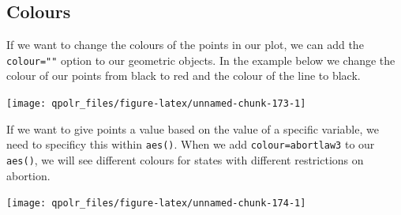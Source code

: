 \documentclass[12pt,oneside]{reedthesis}
\theoremstyle{definition}
\theoremstyle{definition}
\theoremstyle{definition}
\theoremstyle{remark}
\begin{document}
  \subsection{Colours}\label{colours}
  
  If we want to change the colours of the points in our plot, we can add
  the \texttt{colour=""} option to our geometric objects. In the example
  below we change the colour of our points from black to red and the
  colour of the line to black.
  \begin{Shaded}
  \begin{Highlighting}[]
  \NormalTok{(}\OperatorTok{+}
  \StringTok{  }\NormalTok{(}\NormalTok{) }\OperatorTok{+}\StringTok{ }
  \StringTok{  }\NormalTok{(}\NormalTok{, }\NormalTok{) }\OperatorTok{+}
  \StringTok{  }\NormalTok{()}
  \end{Highlighting}
  \end{Shaded}
  \begin{center}\texttt{[image: qpolr\_files/figure-latex/unnamed-chunk-173-1]} \end{center}
  
  If we want to give points a value based on the value of a specific
  variable, we need to specificy this within \texttt{aes()}. When we add
  \texttt{colour=abortlaw3} to our \texttt{aes()}, we will see different
  colours for states with different restrictions on abortion.
  \begin{Shaded}
  \begin{Highlighting}[]
  \NormalTok{(}\OperatorTok{+}
  \StringTok{  }\NormalTok{(}\NormalTok{(}\OperatorTok{+}\StringTok{ }
  \StringTok{  }\NormalTok{(}\NormalTok{, }\NormalTok{) }\OperatorTok{+}
  \StringTok{  }\NormalTok{()}
  \end{Highlighting}
  \end{Shaded}
  \begin{center}\texttt{[image: qpolr\_files/figure-latex/unnamed-chunk-174-1]} \end{center}
  
\end{document}

